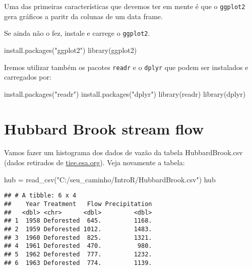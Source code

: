 \documentclass[
]{book}
\newenvironment{Shaded}{\begin{snugshade}}{\end{snugshade}}
\newcommand{\FunctionTok}[1]{\textcolor[rgb]{0.00,0.00,0.00}{#1}}
\newcommand{\NormalTok}[1]{#1}
\newcommand{\OtherTok}[1]{\textcolor[rgb]{0.56,0.35,0.01}{#1}}
\newcommand{\StringTok}[1]{\textcolor[rgb]{0.31,0.60,0.02}{#1}}
\begin{document}
Uma das primeiras características que devemos ter em mente é que o \texttt{ggplot2} gera gráficos a paritr da colunas de um data frame.

Se ainda não o fez, instale e carrege o \texttt{ggplot2}.

\begin{Shaded}
\begin{Highlighting}[]
\FunctionTok{install.packages}\NormalTok{(}\StringTok{"ggplot2"}\NormalTok{)}
\FunctionTok{library}\NormalTok{(ggplot2)}
\end{Highlighting}
\end{Shaded}

Iremos utilizar também os pacotes \texttt{readr} e o \texttt{dplyr} que podem ser instalados e carregados por:

\begin{Shaded}
\begin{Highlighting}[]
\FunctionTok{install.packages}\NormalTok{(}\StringTok{"readr"}\NormalTok{)}
\FunctionTok{install.packages}\NormalTok{(}\StringTok{"dplyr"}\NormalTok{)}
\FunctionTok{library}\NormalTok{(readr)}
\FunctionTok{library}\NormalTok{(dplyr)}
\end{Highlighting}
\end{Shaded}

\hypertarget{hubbard-brook-stream-flow}{%
\section{Hubbard Brook stream flow}\label{hubbard-brook-stream-flow}}

Vamos fazer um histograma dos dados de vazão da tabela HubbardBrook.csv (dados retirados de \href{https://tiee.esa.org/vol/v1/data_sets/hubbard/hubbard_overview.html}{tiee.esa.org}). Veja novamente a tabela:

\begin{Shaded}
\begin{Highlighting}[]
\NormalTok{hub }\OtherTok{=} \FunctionTok{read\_csv}\NormalTok{(}\StringTok{"C:/seu\_caminho/IntroR/HubbardBrook.csv"}\NormalTok{)}
\NormalTok{hub}
\end{Highlighting}
\end{Shaded}

\begin{verbatim}
## # A tibble: 6 x 4
##    Year Treatment   Flow Precipitation
##   <dbl> <chr>      <dbl>         <dbl>
## 1  1958 Deforested  645.         1168.
## 2  1959 Deforested 1012.         1483.
## 3  1960 Deforested  825.         1321.
## 4  1961 Deforested  470.          980.
## 5  1962 Deforested  777.         1232.
## 6  1963 Deforested  774.         1139.
\end{verbatim}
\end{document}
